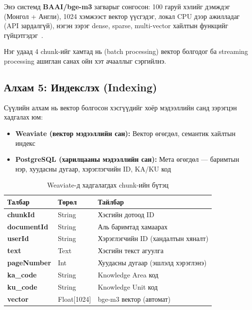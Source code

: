 \documentclass[12pt,A4]{report}
\begin{document}
Энэ системд \textbf{BAAI/bge-m3} загварыг сонгосон: 100 гаруй хэлийг дэмждэг (Монгол + Англи), 1024 хэмжээст вектор үүсгэдэг, локал CPU дээр ажилладаг (API зардалгүй), нэгэн зэрэг dense, sparse, multi-vector хайлтын функцийг гүйцэтгэдэг~\cite{chen2024}.

Нэг удаад 4 chunk-ийг хамтад нь (batch processing) вектор болгодог ба streaming processing ашиглан санах ойн хэт ачааллыг сэргийлнэ.

\subsection{Алхам 5: Индекслэх (Indexing)}

Сүүлийн алхам нь вектор болгосон хэсгүүдийг хоёр мэдээллийн санд зэрэгцэн хадгалах юм:

\begin{itemize}
    \item \textbf{Weaviate (вектор мэдээллийн сан):} Вектор өгөгдөл, семантик хайлтын индекс
    \item \textbf{PostgreSQL (харилцааны мэдээллийн сан):} Мета өгөгдөл --- баримтын нэр, хуудасны дугаар, хэрэглэгчийн ID, KA/KU код
\end{itemize}

\begin{table}[h!]
\centering
\caption{Weaviate-д хадгалагдах chunk-ийн бүтэц}
\label{tab:weaviate_schema}
\begin{tabularx}{\textwidth}{>{\bfseries\ttfamily}l l X}
\toprule
\textbf{Талбар} & \textbf{Төрөл} & \textbf{Тайлбар} \\
\midrule
\rowcolor{lightbg}
chunkId & String & Хэсгийн дотоод ID \\
documentId & String & Аль баримтад хамаарах \\
\rowcolor{lightbg}
userId & String & Хэрэглэгчийн ID (хандалтын хяналт) \\
text & Text & Хэсгийн текст агуулга \\
\rowcolor{lightbg}
pageNumber & Int & Хуудасны дугаар (эшлэлд хэрэглэнэ) \\
ka\_code & String & Knowledge Area код \\
\rowcolor{lightbg}
ku\_code & String & Knowledge Unit код \\
vector & Float[1024] & bge-m3 вектор (автомат) \\
\bottomrule
\end{tabularx}
\end{table}
\end{document}
